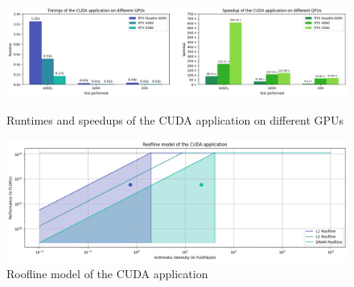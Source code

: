 \documentclass[11pt, journal]{IEEEtran}
\begin{document}
\begin{figure}
    \label{cuda_runtimes_speedups}
    \centering
    \includegraphics[width=\linewidth]{imgs/cuda_timings_speedups.png}
    \caption{Runtimes and speedups of the CUDA application on different GPUs}


    \label{cuda_roofline}
    \includegraphics[width=\linewidth]{imgs/roofline.png}
    \caption{Roofline model of the CUDA application}
\end{figure}
\end{document}
